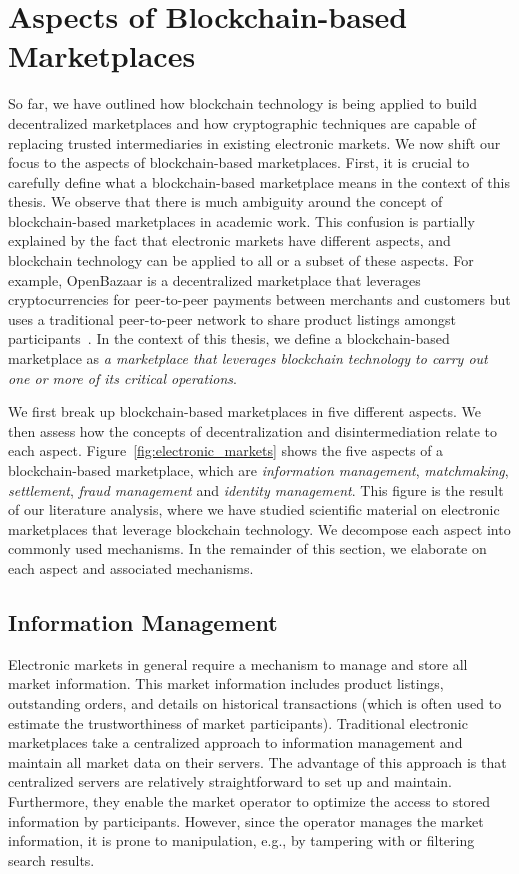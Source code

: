\section{Aspects of Blockchain-based Marketplaces}
So far, we have outlined how blockchain technology is being applied to build decentralized marketplaces and how cryptographic techniques are capable of replacing trusted intermediaries in existing electronic markets.
We now shift our focus to the aspects of blockchain-based marketplaces.
First, it is crucial to carefully define what a blockchain-based marketplace means in the context of this thesis.
We observe that there is much ambiguity around the concept of blockchain-based marketplaces in academic work.
This confusion is partially explained by the fact that electronic markets have different aspects, and blockchain technology can be applied to all or a subset of these aspects.
For example, OpenBazaar is a decentralized marketplace that leverages cryptocurrencies for peer-to-peer payments between merchants and customers but uses a traditional peer-to-peer network to share product listings amongst participants~\cite{openbazaar}.
In the context of this thesis, we define a blockchain-based marketplace as \emph{a marketplace that leverages blockchain technology to carry out one or more of its critical operations}.

We first break up blockchain-based marketplaces in five different aspects.
We then assess how the concepts of decentralization and disintermediation relate to each aspect.
Figure~\ref{fig:electronic_markets} shows the five aspects of a blockchain-based marketplace, which are \emph{information management}, \emph{matchmaking}, \emph{settlement}, \emph{fraud management} and \emph{identity management}.
This figure is the result of our literature analysis, where we have studied scientific material on electronic marketplaces that leverage blockchain technology.
We decompose each aspect into commonly used mechanisms.
In the remainder of this section, we elaborate on each aspect and associated mechanisms.

\subsection{Information Management}
Electronic markets in general require a mechanism to manage and store all market information.
This market information includes product listings, outstanding orders, and details on historical transactions (which is often used to estimate the trustworthiness of market participants).
Traditional electronic marketplaces take a centralized approach to information management and maintain all market data on their servers.
The advantage of this approach is that centralized servers are relatively straightforward to set up and maintain.
Furthermore, they enable the market operator to optimize the access to stored information by participants.
However, since the operator manages the market information, it is prone to manipulation, e.g., by tampering with or filtering search results.

